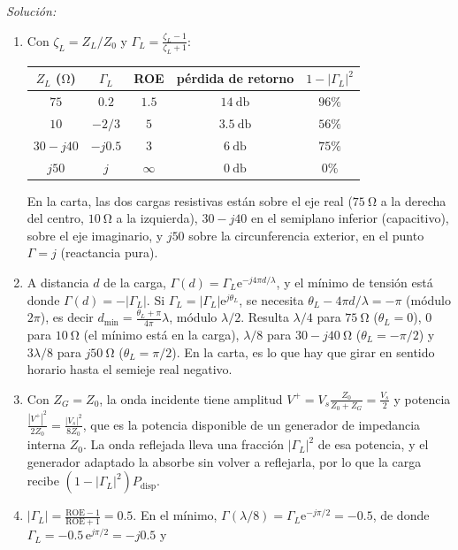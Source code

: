 \documentclass[a4paper,11pt]{article}
\newcommand{\e}{\mathrm{e}}
\newenvironment{solucion}[1][]{
\noindent \large \textsl{Solución:} \ifthenelse{\equal{#1}{}}{}{\emph{(#1)}}

\smallskip
}{
\bigskip
}
\begin{document}
\begin{solucion}
\begin{enumerate}
\item Con $\zeta_L=Z_L/Z_0$ y $\Gamma_L=\frac{\zeta_L-1}{\zeta_L+1}$:
\begin{center}
\begin{tabular}{c|c|c|c|c}
$Z_L$ ($\unit{\ohm}$) & $\Gamma_L$ & ROE & pérdida de retorno & $1-|\Gamma_L|^2$\\ \hline
$75$ & $0.2$ & $1.5$ & $14\ \unit{\decibel}$ & $96\%$\\
$10$ & $-2/3$ & $5$ & $3.5\ \unit{\decibel}$ & $56\%$\\
$30-j40$ & $-j0.5$ & $3$ & $6\ \unit{\decibel}$ & $75\%$\\
$j50$ & $j$ & $\infty$ & $0\ \unit{\decibel}$ & $0\%$
\end{tabular}
\end{center}
En la carta, las dos cargas resistivas están sobre el eje real ($75\ \unit{\ohm}$ a la derecha del centro, $10\ \unit{\ohm}$ a la izquierda), $30-j40$ en el semiplano inferior (capacitivo), sobre el eje imaginario, y $j50$ sobre la circunferencia exterior, en el punto $\Gamma=j$ (reactancia pura).
\item A distancia $d$ de la carga, $\Gamma(d)=\Gamma_L\e^{-j4\pi d/\lambda}$, y el mínimo de tensión está donde $\Gamma(d)=-|\Gamma_L|$. Si $\Gamma_L=|\Gamma_L|\e^{j\theta_L}$, se necesita $\theta_L-4\pi d/\lambda=-\pi$ (módulo $2\pi$), es decir $d_{\min}=\frac{\theta_L+\pi}{4\pi}\lambda$, módulo $\lambda/2$. Resulta $\lambda/4$ para $75\ \unit{\ohm}$ ($\theta_L=0$), $0$ para $10\ \unit{\ohm}$ (el mínimo está en la carga), $\lambda/8$ para $30-j40\ \unit{\ohm}$ ($\theta_L=-\pi/2$) y $3\lambda/8$ para $j50\ \unit{\ohm}$ ($\theta_L=\pi/2$). En la carta, es lo que hay que girar en sentido horario hasta el semieje real negativo.
\item Con $Z_G=Z_0$, la onda incidente tiene amplitud $V^+=V_s\frac{Z_0}{Z_0+Z_G}=\frac{V_s}{2}$ y potencia $\frac{|V^+|^2}{2Z_0}=\frac{|V_s|^2}{8Z_0}$, que es la potencia disponible de un generador de impedancia interna $Z_0$. La onda reflejada lleva una fracción $|\Gamma_L|^2$ de esa potencia, y el generador adaptado la absorbe sin volver a reflejarla, por lo que la carga recibe $(1-|\Gamma_L|^2)P_{\text{disp}}$.
\item $|\Gamma_L|=\frac{\mathrm{ROE}-1}{\mathrm{ROE}+1}=0.5$. En el mínimo, $\Gamma(\lambda/8)=\Gamma_L\e^{-j\pi/2}=-0.5$, de donde $\Gamma_L=-0.5\,\e^{j\pi/2}=-j0.5$ y
\begin{equation*}

\end{equation*}
\end{enumerate}
\end{solucion}
\end{document}
